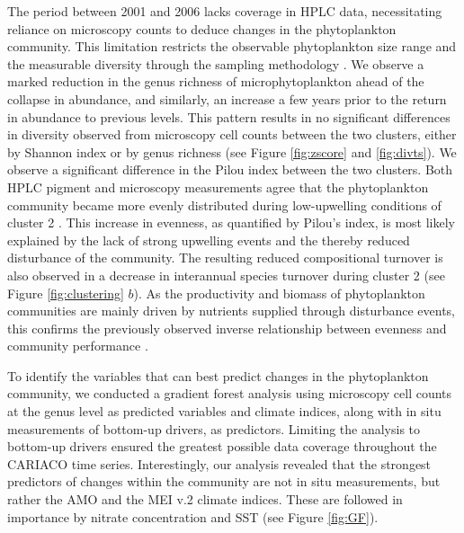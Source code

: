 The period between 2001 and 2006 lacks coverage in HPLC data, necessitating reliance on microscopy counts to deduce changes in the phytoplankton community. This limitation restricts the observable phytoplankton size range and the measurable diversity through the sampling methodology \cite{cermeno_sampling_2014}. We observe a marked reduction in the genus richness of microphytoplankton ahead of the collapse in abundance, and similarly, an increase a few years prior to the return in abundance to previous levels. 
This pattern results in no significant differences in diversity observed from microscopy cell counts between the two clusters, either by Shannon index or by genus richness (see Figure \ref{fig:zscore} and \ref{fig:divts}).
We observe a significant difference in the Pilou index between the two clusters. Both HPLC pigment and microscopy measurements agree that the phytoplankton community became more evenly distributed during low-upwelling conditions of cluster 2 \cite{pinckney_phytoplankton_2015}. This increase in evenness, as quantified by Pilou's index, is most likely explained by the lack of strong upwelling events and the thereby reduced disturbance of the community. The resulting reduced compositional turnover is also observed in a decrease in interannual species turnover during cluster 2 (see Figure \ref{fig:clustering} $b$). As the productivity and biomass of phytoplankton communities are mainly driven by nutrients supplied through disturbance events, this confirms the previously observed inverse relationship between evenness and community performance \cite{lehtinen_phytoplankton_2017, otero_phytoplankton_2020}.

To identify the variables that can best predict changes in the phytoplankton community, we conducted a gradient forest analysis using microscopy cell counts at the genus level as predicted variables and climate indices, along with in situ measurements of bottom-up drivers, as predictors. Limiting the analysis to bottom-up drivers ensured the greatest possible data coverage throughout the CARIACO time series. Interestingly, our analysis revealed that the strongest predictors of changes within the community are not in situ measurements, but rather the AMO and the MEI v.2 climate indices. These are followed in importance by nitrate concentration and SST (see Figure \ref{fig:GF}).

